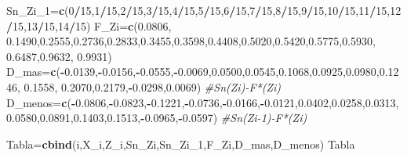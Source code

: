 \documentclass[a4paper,oneside,openany]{book}
\newenvironment{Shaded}{\begin{snugshade}}{\end{snugshade}}
\newcommand{\KeywordTok}[1]{\textcolor[rgb]{0.13,0.29,0.53}{\textbf{#1}}}
\newcommand{\DecValTok}[1]{\textcolor[rgb]{0.00,0.00,0.81}{#1}}
\newcommand{\FloatTok}[1]{\textcolor[rgb]{0.00,0.00,0.81}{#1}}
\newcommand{\CommentTok}[1]{\textcolor[rgb]{0.56,0.35,0.01}{\textit{#1}}}
\newcommand{\OperatorTok}[1]{\textcolor[rgb]{0.81,0.36,0.00}{\textbf{#1}}}
\newcommand{\NormalTok}[1]{#1}
\begin{document}
\begin{Shaded}
\begin{Highlighting}[]
\NormalTok{Sn_Zi_}\DecValTok{1}\NormalTok{=}\KeywordTok{c}\NormalTok{(}\DecValTok{0}\OperatorTok{/}\DecValTok{15}\NormalTok{,}\DecValTok{1}\OperatorTok{/}\DecValTok{15}\NormalTok{,}\DecValTok{2}\OperatorTok{/}\DecValTok{15}\NormalTok{,}\DecValTok{3}\OperatorTok{/}\DecValTok{15}\NormalTok{,}\DecValTok{4}\OperatorTok{/}\DecValTok{15}\NormalTok{,}\DecValTok{5}\OperatorTok{/}\DecValTok{15}\NormalTok{,}\DecValTok{6}\OperatorTok{/}\DecValTok{15}\NormalTok{,}\DecValTok{7}\OperatorTok{/}\DecValTok{15}\NormalTok{,}\DecValTok{8}\OperatorTok{/}\DecValTok{15}\NormalTok{,}\DecValTok{9}\OperatorTok{/}\DecValTok{15}\NormalTok{,}\DecValTok{10}\OperatorTok{/}\DecValTok{15}\NormalTok{,}\DecValTok{11}\OperatorTok{/}\DecValTok{15}\NormalTok{,}\DecValTok{12}\OperatorTok{/}\DecValTok{15}\NormalTok{,}\DecValTok{13}\OperatorTok{/}\DecValTok{15}\NormalTok{,}\DecValTok{14}\OperatorTok{/}\DecValTok{15}\NormalTok{)}
\NormalTok{F_Zi=}\KeywordTok{c}\NormalTok{(}\FloatTok{0.0806}\NormalTok{, }\FloatTok{0.1490}\NormalTok{,}\FloatTok{0.2555}\NormalTok{,}\FloatTok{0.2736}\NormalTok{,}\FloatTok{0.2833}\NormalTok{,}\FloatTok{0.3455}\NormalTok{,}\FloatTok{0.3598}\NormalTok{,}\FloatTok{0.4408}\NormalTok{,}\FloatTok{0.5020}\NormalTok{,}\FloatTok{0.5420}\NormalTok{,}\FloatTok{0.5775}\NormalTok{,}\FloatTok{0.5930}\NormalTok{,}
       \FloatTok{0.6487}\NormalTok{,}\FloatTok{0.9632}\NormalTok{, }\FloatTok{0.9931}\NormalTok{)}
\NormalTok{D_mas=}\KeywordTok{c}\NormalTok{(}\OperatorTok{-}\FloatTok{0.0139}\NormalTok{,}\OperatorTok{-}\FloatTok{0.0156}\NormalTok{,}\OperatorTok{-}\FloatTok{0.0555}\NormalTok{,}\OperatorTok{-}\FloatTok{0.0069}\NormalTok{,}\FloatTok{0.0500}\NormalTok{,}\FloatTok{0.0545}\NormalTok{,}\FloatTok{0.1068}\NormalTok{,}\FloatTok{0.0925}\NormalTok{,}\FloatTok{0.0980}\NormalTok{,}\FloatTok{0.1246}\NormalTok{, }\FloatTok{0.1558}\NormalTok{,}
        \FloatTok{0.2070}\NormalTok{,}\FloatTok{0.2179}\NormalTok{,}\OperatorTok{-}\FloatTok{0.0298}\NormalTok{,}\FloatTok{0.0069}\NormalTok{)    }\CommentTok{#Sn(Zi)-F*(Zi)}
\NormalTok{D_menos=}\KeywordTok{c}\NormalTok{(}\OperatorTok{-}\FloatTok{0.0806}\NormalTok{,}\OperatorTok{-}\FloatTok{0.0823}\NormalTok{,}\OperatorTok{-}\FloatTok{0.1221}\NormalTok{,}\OperatorTok{-}\FloatTok{0.0736}\NormalTok{,}\OperatorTok{-}\FloatTok{0.0166}\NormalTok{,}\OperatorTok{-}\FloatTok{0.0121}\NormalTok{,}\FloatTok{0.0402}\NormalTok{,}\FloatTok{0.0258}\NormalTok{,}\FloatTok{0.0313}\NormalTok{, }
          \FloatTok{0.0580}\NormalTok{,}\FloatTok{0.0891}\NormalTok{,}\FloatTok{0.1403}\NormalTok{,}\FloatTok{0.1513}\NormalTok{,}\OperatorTok{-}\FloatTok{0.0965}\NormalTok{,}\OperatorTok{-}\FloatTok{0.0597}\NormalTok{)   }\CommentTok{#Sn(Zi-1)-F*(Zi)}

\NormalTok{Tabla=}\KeywordTok{cbind}\NormalTok{(i,X_i,Z_i,Sn_Zi,Sn_Zi_}\DecValTok{1}\NormalTok{,F_Zi,D_mas,D_menos)}
\NormalTok{Tabla}
\end{Highlighting}
\end{Shaded}
\end{document}
